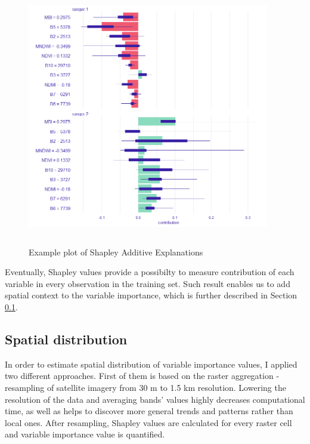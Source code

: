 \documentclass{amuthesis}
\begin{document}
\begin{figure}[t]

{\centering \includegraphics[width=4.16667in,height=4.45833in]{./figures/shapley_values.png}

}

\caption{\label{fig-rycina8}Example plot of Shapley Additive
Explanations}

\end{figure}

Eventually, Shapley values provide a possibilty to measure contribution
of each variable in every observation in the training set. Such result
enables us to add spatial context to the variable importance, which is
further described in Section \ref{sec-importance-distribution}.

\hypertarget{sec-importance-distribution}{%
\subsection{Spatial distribution}\label{sec-importance-distribution}}

In order to estimate spatial distribution of variable importance values,
I applied two different approaches. First of them is based on the raster
aggregation - resampling of satellite imagery from 30 m to 1.5 km
resolution. Lowering the resolution of the data and averaging bands'
values highly decreases computational time, as well as helps to discover
more general trends and patterns rather than local ones. After
resampling, Shapley values are calculated for every raster cell and
variable importance value is quantified.
\end{document}
